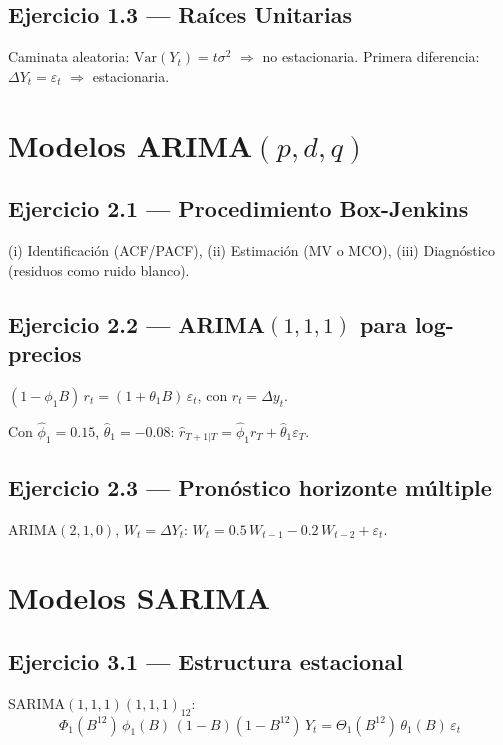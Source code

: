 \documentclass[12pt,letterpaper]{article}
\begin{document}
\subsection*{Ejercicio 1.3 --- Ra\'ices Unitarias}

Caminata aleatoria: $\mathrm{Var}(Y_t)=t\sigma^2$ $\Rightarrow$ no estacionaria.
Primera diferencia: $\Delta Y_t=\varepsilon_t$ $\Rightarrow$ estacionaria.

\section{Modelos ARIMA$(p,d,q)$}

\subsection*{Ejercicio 2.1 --- Procedimiento Box-Jenkins}

(i) Identificaci\'on (ACF/PACF), (ii) Estimaci\'on (MV o MCO),
(iii) Diagn\'ostico (residuos como ruido blanco).

\subsection*{Ejercicio 2.2 --- ARIMA$(1,1,1)$ para log-precios}

$(1-\phi_1 B)\,r_t=(1+\theta_1 B)\,\varepsilon_t$, con $r_t=\Delta y_t$.

Con $\hat{\phi}_1=0.15$, $\hat{\theta}_1=-0.08$:
$\hat{r}_{T+1|T}=\hat{\phi}_1 r_T+\hat{\theta}_1\varepsilon_T$.

\subsection*{Ejercicio 2.3 --- Pron\'ostico horizonte m\'ultiple}

ARIMA$(2,1,0)$, $W_t=\Delta Y_t$:
$W_t=0.5\,W_{t-1}-0.2\,W_{t-2}+\varepsilon_t$.

\section{Modelos SARIMA}

\subsection*{Ejercicio 3.1 --- Estructura estacional}

SARIMA$(1,1,1)(1,1,1)_{12}$:
\[
  \Phi_1(B^{12})\,\phi_1(B)\,(1-B)(1-B^{12})\,Y_t
  =\Theta_1(B^{12})\,\theta_1(B)\,\varepsilon_t
\]
\end{document}
